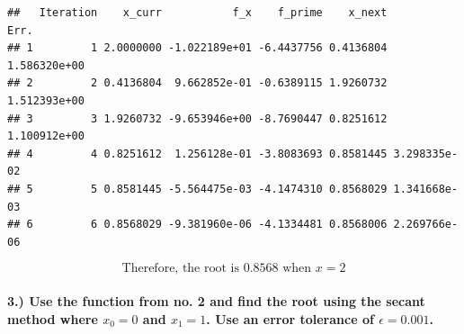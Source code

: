\documentclass[
]{article}
\begin{document}
\begin{verbatim}
##   Iteration    x_curr           f_x    f_prime    x_next         Err.
## 1         1 2.0000000 -1.022189e+01 -6.4437756 0.4136804 1.586320e+00
## 2         2 0.4136804  9.662852e-01 -0.6389115 1.9260732 1.512393e+00
## 3         3 1.9260732 -9.653946e+00 -8.7690447 0.8251612 1.100912e+00
## 4         4 0.8251612  1.256128e-01 -3.8083693 0.8581445 3.298335e-02
## 5         5 0.8581445 -5.564475e-03 -4.1474310 0.8568029 1.341668e-03
## 6         6 0.8568029 -9.381960e-06 -4.1334481 0.8568006 2.269766e-06
\end{verbatim}

\[
\boxed{\text{Therefore, the root is } 0.8568 \text{ when } x=2}
\]

\paragraph{\texorpdfstring{3.) Use the function from no. 2 and find the
root using the secant method where \(x_0=0\) and \(x_1=1\). Use an error
tolerance of
\(\epsilon = 0.001\).}{3.) Use the function from no. 2 and find the root using the secant method where x\_0=0 and x\_1=1. Use an error tolerance of \textbackslash epsilon = 0.001.}}\label{use-the-function-from-no.-2-and-find-the-root-using-the-secant-method-where-x_00-and-x_11.-use-an-error-tolerance-of-epsilon-0.001.}
\end{document}
